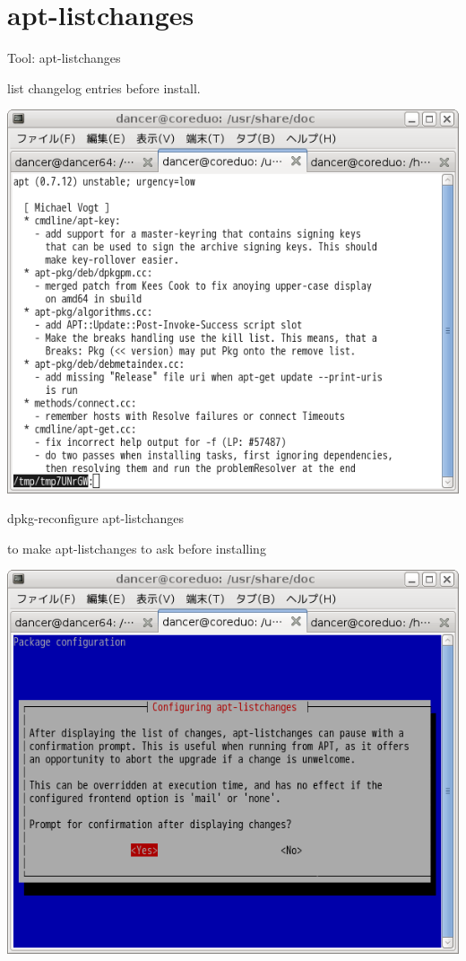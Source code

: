 \documentclass[cjk,dvipdfm,12pt]{beamer}
\begin{document}
\section{apt-listchanges}
\begin{frame}[containsverbatim]{Tool: apt-listchanges}
\begin{minipage}{0.49\hsize}
 
 list changelog entries before install.

 \includegraphics[width=1\hsize]{image200805/apt-listchanges.png}
\end{minipage}
\begin{minipage}{0.49\hsize}

\begin{commandline}
  dpkg-reconfigure apt-listchanges
\end{commandline} 
to make apt-listchanges to ask before installing

 \includegraphics[width=1\hsize]{image200805/apt-listchanges-qa.png}
\end{minipage}
\end{frame}
\end{document}
